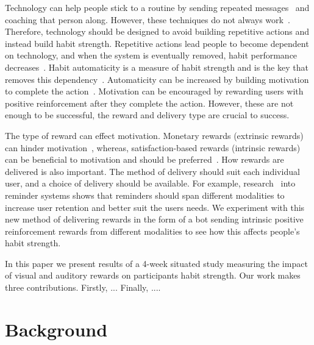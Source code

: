 \documentclass{scaffold/sigchi}
\begin{document}
Technology can help people stick to a routine by sending repeated messages~\cite{chi_crowd_designed_motivation} and coaching that person along. However, these techniques do not always work~\cite{coaching_not_that_good}. Therefore, technology should be designed to avoid building repetitive actions and instead build habit strength. Repetitive actions lead people to become dependent on technology, and when the system is eventually removed, habit performance decreases~\cite{article_dont_kick_habit}. Habit automaticity is a measure of habit strength and is the key that removes this dependency~\cite{article_beyond_self_tracking_designing_apps}. Automaticity can be increased by building motivation to complete the action~\cite{article_a_self_efficacy, article_meta_analytic_review_intrinsic_motivation}.
Motivation can be encouraged by rewarding users with positive reinforcement after they complete the action.
However, these are not enough to be successful, the reward and delivery type are crucial to success.

The type of reward can effect motivation. Monetary rewards (extrinsic rewards) can hinder motivation~\cite{article_meta_analytic_review_intrinsic_motivation}, whereas, satisfaction-based rewards (intrinsic rewards) can be beneficial to motivation and should be preferred~\cite{article_meta_analytic_review_intrinsic_motivation}.
How rewards are delivered is also important. The method of delivery should suit each individual user, and a choice of delivery should be available. For example, research~\cite{article_user_centred_multimodal_reminders} into reminder systems shows that reminders should span different modalities to increase user retention and better suit the users needs.
We experiment with this new method of delivering rewards in the form of a bot sending intrinsic positive reinforcement rewards from different modalities to see how this affects people's habit strength.

In this paper we present results of a 4-week situated study measuring the impact of visual and auditory rewards on participants habit strength. Our work makes three contributions. Firstly, ... Finally, ....

\section{Background}
\end{document}
